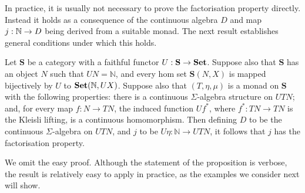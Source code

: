 In practice, it is usually not necessary to prove the factorisation property directly. Instead  it holds as a consequence of the continuous algebra $D$ and map $j: \mathbb{N} \to D$ being derived from a suitable monad. The next result establishes general conditions under which this holds.
\begin{proposition}
\label{proposition:monad}
Let $\mathbf{S}$ be a category with a faithful functor $U : \mathbf{S} \to \mathbf{Set}$. Suppose also that 
$\mathbf{S}$ has an object $N$ such that $UN = \mathbb{N}$, and every hom set $\mathbf{S}(N,X)$
is mapped bijectively by $U$ to $\mathbf{Set}(\mathbb{N},UX)$. Suppose also that $(T,\eta,\mu)$ is a monad on $\mathbf{S}$
with the following properties: there is a continuous $\Sigma$-algebra structure on $UTN$; and, for 
every map $f \colon N \to TN$, the induced function $Uf^*$, where 
$f^* \colon TN \to TN$ is the Kleisli lifting, is a continuous  homomorphism.
Then defining $D$ to be the continuous $\Sigma$-algebra on $U T N$, and
$j$ to be $U\eta \colon \mathbb{N} \to UTN$, it follows that $j$ has the factorisation property.
\end{proposition}



\noindent
We omit the easy proof. 
Although the statement of the proposition is verbose, the result is relatively easy to apply in practice, as the examples we consider next will show.

%
%

